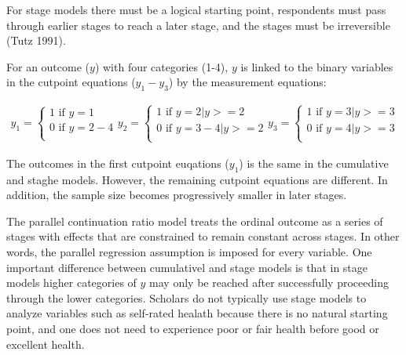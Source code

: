 For stage models there must be a logical starting point, respondents must pass through earlier stages to reach a later stage, and the stages must be irreversible (Tutz 1991).

For an outcome ($y$) with four categories (1-4), $y$ is linked to the binary variables in the cutpoint equations ($y_{1} - y_{3}$) by the measurement equations:

\begin{eqnarray}
	y_{1} =
	\begin{cases}
	1 \text{ if } y = 1 \nonumber \\
	0 \text{ if } y = 2-4 \nonumber \\
\end{cases}
	y_{2} =
	\begin{cases}
	1 \text{ if } y = 2 | y >= 2 \nonumber \\
	0 \text{ if } y = 3-4 | y >= 2 \nonumber \\
\end{cases}
	y_{3} =
	\begin{cases}
	1 \text{ if } y = 3 | y >= 3 \nonumber \\
	0 \text{ if } y = 4 | y >= 3 \nonumber \\
\end{cases}
\end{eqnarray}

The outcomes in the first cutpoint euqations ($y_{1}$) is the same in the cumulative and staghe models. However, the remaining cutpoint equations are different. In addition, the sample size becomes progressively smaller in later stages.

The parallel continuation ratio model treats the ordinal outcome as a series of stages with effects that are constrained to remain constant across stages. In other words, the parallel regression assumption is imposed for every variable. One important difference between cumulativel and stage models is that in stage models higher categories of $y$ may only be reached after successfully proceeding through the lower categories. Scholars do not typically use stage models to analyze variables such as self-rated healath because there is no natural starting point, and one does not need to experience poor or fair health before good or excellent health.


